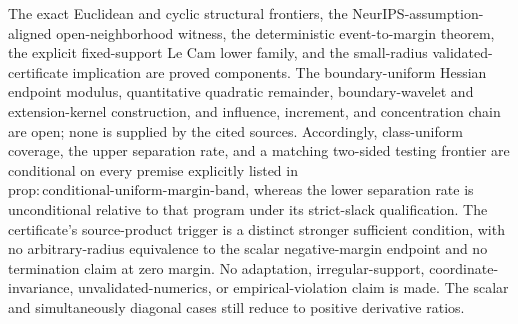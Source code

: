 \documentclass{article}
\begin{document}
The exact Euclidean and cyclic structural frontiers, the NeurIPS-assumption-aligned open-neighborhood witness, the deterministic event-to-margin theorem, the explicit fixed-support Le Cam lower family, and the small-radius validated-certificate implication are proved components. The boundary-uniform Hessian endpoint modulus, quantitative quadratic remainder, boundary-wavelet and extension-kernel construction, and influence, increment, and concentration chain are open; none is supplied by the cited sources. Accordingly, class-uniform coverage, the upper separation rate, and a matching two-sided testing frontier are conditional on every premise explicitly listed in \(\mathrm{prop:conditional\text{-}uniform\text{-}margin\text{-}band}\), whereas the lower separation rate is unconditional relative to that program under its strict-slack qualification. The certificate's source-product trigger is a distinct stronger sufficient condition, with no arbitrary-radius equivalence to the scalar negative-margin endpoint and no termination claim at zero margin. No adaptation, irregular-support, coordinate-invariance, unvalidated-numerics, or empirical-violation claim is made. The scalar and simultaneously diagonal cases still reduce to positive derivative ratios.
\end{document}
